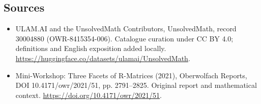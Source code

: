 \documentclass[11pt]{article}
\begin{document}
\subsection{Sources}
\begin{itemize}
\item[\hypertarget{source:30004880:1}{S1}] ULAM.AI and the UnsolvedMath Contributors, UnsolvedMath, record 30004880 (OWR-8415354-006). Catalogue curation under CC BY 4.0; definitions and English exposition added locally.
\url{https://huggingface.co/datasets/ulamai/UnsolvedMath}.
\item[\hypertarget{source:30004880:2}{S2}] Mini-Workshop: Three Facets of R-Matrices (2021), Oberwolfach Reports, DOI 10.4171/owr/2021/51, pp. 2791--2825. Original report and mathematical context.
\url{https://doi.org/10.4171/owr/2021/51}.
\end{itemize}
\label{end:30004880}
\end{document}
